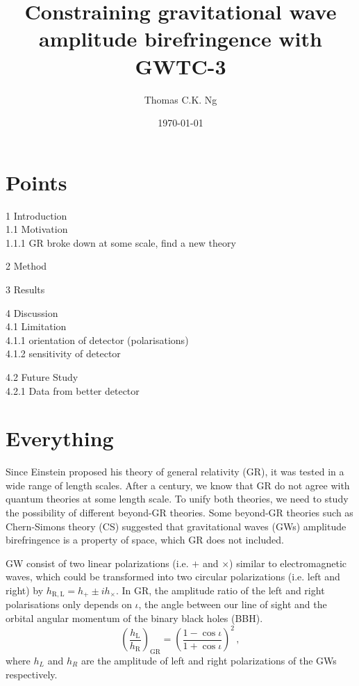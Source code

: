 \documentclass[twocolumn]{aastex631}
\begin{document}
\title{Constraining gravitational wave amplitude birefringence with GWTC-3}

\author{Thomas C.K. Ng}

\date{\today}

\begin{abstract}
    
\end{abstract}

\section{Points}

1 Introduction\\
1.1 Motivation\\
1.1.1 GR broke down at some scale, find a new theory

2 Method

3 Results

4 Discussion\\
4.1 Limitation\\
4.1.1 orientation of detector (polarisations)\\
4.1.2 sensitivity of detector

4.2 Future Study\\
4.2.1 Data from better detector

\section{Everything}
Since Einstein proposed his theory of general relativity (GR), it was tested in a wide range of length scales.
After a century, we know that GR do not agree with quantum theories at some length scale.
To unify both theories, we need to study the possibility of different beyond-GR theories.
Some beyond-GR theories such as Chern-Simons theory (CS) suggested that gravitational waves (GWs) amplitude birefringence is a property of space,
which GR does not included.

GW consist of two linear polarizations (i.e. $+$ and $\times$) similar to electromagnetic waves,
which could be transformed into two circular polarizations (i.e. left and right) by $h_{\mathrm{R}, \mathrm{L}} = h_+ \pm i h_\times$.
In GR, the amplitude ratio of the left and right polarisations only depends on $\iota$,
the angle between our line of sight and the orbital angular momentum of the binary black holes (BBH).
\begin{equation}
    \left(\frac{h_\mathrm{L}}{h_\mathrm{R}}\right)_\mathrm{GR}=\left(\frac{1-\cos\iota}{1+\cos\iota}\right)^2\,,
\end{equation}where $h_L$ and $h_R$ are the amplitude of left and right polarizations of the GWs respectively.
\end{document}
